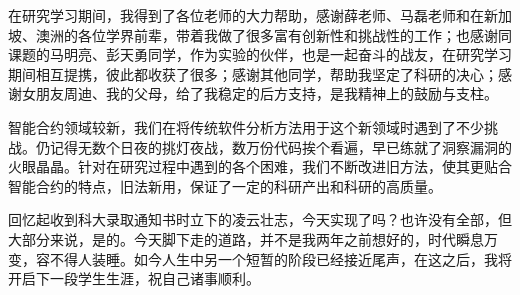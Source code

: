 
\begin{acknowledgments}

在研究学习期间，我得到了各位老师的大力帮助，感谢薛老师、马磊老师和在新加坡、澳洲的各位学界前辈，带着我做了很多富有创新性和挑战性的工作；也感谢同课题的马明亮、彭天勇同学，作为实验的伙伴，也是一起奋斗的战友，在研究学习期间相互提携，彼此都收获了很多；感谢其他同学，帮助我坚定了科研的决心；感谢女朋友周迪、我的父母，给了我稳定的后方支持，是我精神上的鼓励与支柱。

智能合约领域较新，我们在将传统软件分析方法用于这个新领域时遇到了不少挑战。仍记得无数个日夜的挑灯夜战，数万份代码挨个看遍，早已练就了洞察漏洞的火眼晶晶。针对在研究过程中遇到的各个困难，我们不断改进旧方法，使其更贴合智能合约的特点，旧法新用，保证了一定的科研产出和科研的高质量。

回忆起收到科大录取通知书时立下的凌云壮志，今天实现了吗？也许没有全部，但大部分来说，是的。今天脚下走的道路，并不是我两年之前想好的，时代瞬息万变，容不得人装睡。如今人生中另一个短暂的阶段已经接近尾声，在这之后，我将开启下一段学生生涯，祝自己诸事顺利。

\end{acknowledgments}
